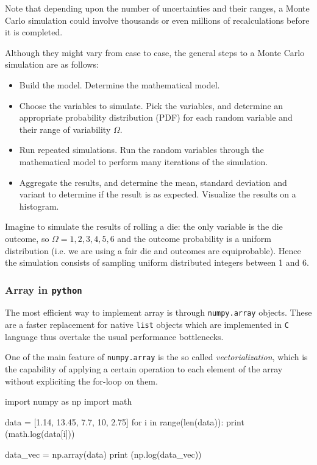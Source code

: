 \documentclass[12pt,a4paper]{book}
\begin{document}
Note that depending upon the number of uncertainties and their ranges, a Monte Carlo simulation could involve thousands or even millions of recalculations before it is completed.

Although they might vary from case to case, the general steps to a Monte Carlo simulation are as follows:
\begin{itemize}
\item Build the model. Determine the mathematical model.
\item Choose the variables to simulate. Pick the variables, and determine an appropriate probability distribution (PDF) for each random variable and their range of variability $\Omega$.
\item Run repeated simulations. Run the random variables through the mathematical model to perform many iterations of the simulation.
\item Aggregate the results, and determine the mean, standard deviation and variant to determine if the result is as expected. Visualize the results on a histogram.
\end{itemize}

Imagine to simulate the results of rolling a die: the only variable is the die outcome, so $\Omega =1,2,3,4,5,6$ and the outcome probability is a uniform distribution (i.e. we are using a fair die and outcomes are equiprobable). Hence the simulation consists of sampling uniform distributed integers between 1 and 6.

\subsubsection{Array in \texttt{python}}

The most efficient way to implement array is through \texttt{numpy.array} objects. These are a faster replacement for native \texttt{list} objects which are implemented in \texttt{C} language thus overtake the usual performance bottlenecks. 

One of the main feature of \texttt{numpy.array} is the so called \emph{vectorialization}, which is the capability of applying a certain operation to each element of the array without expliciting the for-loop on them.
\begin{ipython}
import numpy as np
import math 

data = [1.14, 13.45, 7.7, 10, 2.75]
for i in range(len(data)):
	print (math.log(data[i]))
	
data_vec = np.array(data)
print (np.log(data_vec))
\end{ipython}
\end{document}
